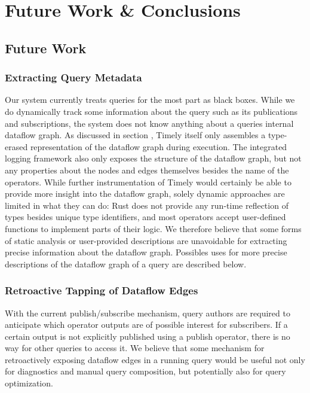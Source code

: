 \cleardoublepage
\chapter{Future Work \& Conclusions} \label{ch:conclusions}

\section{Future Work}



\subsection{Extracting Query Metadata}

Our system currently treats queries for the most part as black boxes. While we
do dynamically track some information about the query such as its publications
and subscriptions, the system does not know anything about a queries internal
dataflow graph. As discussed in section , Timely
itself only assembles a type-erased representation of the dataflow graph
during execution. The integrated logging framework also only exposes the
structure of the dataflow graph, but not any properties about the nodes and
edges themselves besides the name of the operators. While further instrumentation
of Timely would certainly be able to provide more insight into the dataflow
graph, solely dynamic approaches are limited in what they can do:
Rust does not provide any run-time reflection of types besides unique type
identifiers, and most operators accept user-defined functions to implement
parts of their logic. We therefore believe that some forms of static analysis
or user-provided descriptions are unavoidable for extracting precise information
about the dataflow graph. Possibles uses for more precise descriptions of the
dataflow graph of a query are described below.

\subsection{Retroactive Tapping of Dataflow Edges}

With the current publish/subscribe mechanism, query authors are required to
anticipate which operator outputs are of possible interest for subscribers. If
a certain output is not explicitly published using a publish operator, there
is no way for other queries to access it. We believe that some mechanism for
retroactively exposing dataflow edges in a running query would be useful not
only for diagnostics and manual query composition, but potentially also
for query optimization. 

